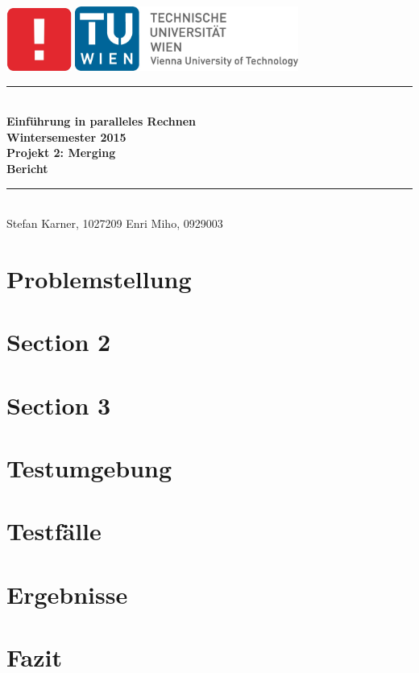 \documentclass[a4paper,12pt]{article}
\begin{document}
\thispagestyle{empty}
\begin{center}
 \includegraphics[width=0.16\textwidth]{resources/informatik_logo}
\includegraphics[width=0.55\textwidth]{resources/tu_logo}\\[1cm]
\newcommand{\HRule}{\rule{\linewidth}{0.5mm}}
\HRule \\[0.4cm]
{ \Large \bfseries Einführung in paralleles Rechnen\\
Wintersemester 2015\\ [0.2cm]
Projekt 2: Merging \\ [0.2cm]
Bericht}\\[0.4cm]

\HRule \\[1.5cm]
{\large
Stefan Karner, 1027209 \hfill Enri Miho, 0929003
}
\end{center}

\newpage
\tableofcontents
\newpage
\section{Problemstellung}
	

\section{Section 2}
\section{Section 3}

\section{Testumgebung}
	
	
\section{Testfälle}
	
	
\section{Ergebnisse}
	
	
\section{Fazit}
	

\newpage


\end{document}
